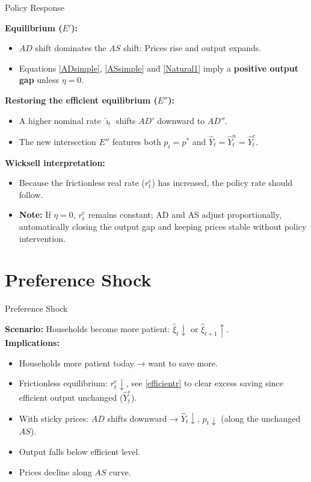 \documentclass[11pt,aspectratio=169]{beamer}
\begin{document}
\begin{frame}[label=GovShockPolicy]{Policy Response}
\small

\textbf{Equilibrium ($E'$):}
\begin{itemize}
    \item $AD$ shift dominates the $AS$ shift: Prices rise and output expands.
    \item Equations \eqref{ADsimple}, \eqref{ASsimple} and \eqref{Natural1} imply a \textbf{positive output gap} unless $\eta=0$.
\end{itemize}

\textbf{Restoring the efficient equilibrium ($E''$):}
\begin{itemize}
    \item A higher nominal rate $\hat{\imath}_t$ shifts $AD'$ downward to $AD''$.
    \item The new intersection $E''$ features both $p_t = p^{\ast}$ and $\hat{Y}_t = \hat{Y}^n_t = \hat{Y}^e_t$.
\end{itemize}

\textbf{Wicksell interpretation:}
\begin{itemize}
    \item Because the frictionless real rate ($r^e_t$) has increased, the policy rate should follow.
    \item \textbf{Note:} If $\eta=0$, $r_t^e$ remains constant; AD and AS adjust proportionally, automatically closing the output gap and keeping prices stable without policy intervention.
\end{itemize}
\end{frame}

\section{Preference Shock}
\begin{frame}[label=PrefShockSetup]{Preference Shock}
\small

\textbf{Scenario:} Households become more patient: $\hat{\xi}_t \downarrow$ or $\hat{\xi}_{t+1} \uparrow$.
\\
\vspace{0.3cm}
\textbf{Implications:}
\begin{itemize}
    \item Households more patient today → want to save more.
    \item Frictionless equilibrium: $r^e_t \downarrow$, see \eqref{efficientr} to clear excess saving since efficient output unchanged ($\hat{Y}^e_t$).
    \item With sticky prices: $AD$ shifts downward → $\hat{Y}_t \downarrow$, $p_t \downarrow$ (along the unchanged $AS$).
    \item Output falls below efficient level.
    \item Prices decline along $AS$ curve.
\end{itemize}

\end{frame}
\end{document}
